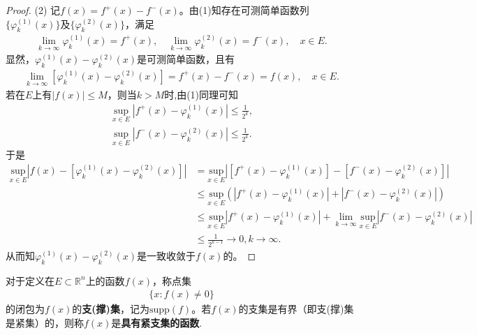 \documentclass[../../main.tex]{subfiles}
\begin{document}
\begin{proof}
(2) 记$f(x) = f^+(x) - f^-(x)$。由(1)知存在可测简单函数列$\{\varphi_k^{(1)}(x)\}$及$\{\varphi_k^{(2)}(x)\}$，满足
\begin{align*}
\lim_{k \to \infty} \varphi_k^{(1)}(x) = f^+(x), \quad \lim_{k \to \infty} \varphi_k^{(2)}(x) = f^-(x), \quad x \in E.
\end{align*}
显然，$\varphi_k^{(1)}(x) - \varphi_k^{(2)}(x)$是可测简单函数，且有
\begin{align*}
\lim_{k \to \infty} [\varphi_k^{(1)}(x) - \varphi_k^{(2)}(x)] = f^+(x) - f^-(x) = f(x), \quad x \in E.
\end{align*}
若在$E$上有$|f(x)| \leqslant M$，则当$k > M$时,由(1)同理可知
\begin{align*}
\sup_{x\in E} |f^+(x) - \varphi_k^{(1)}(x)| \leqslant \frac{1}{2^k},\\
\sup_{x\in E} |f^-(x) - \varphi_k^{(2)}(x)| \leqslant \frac{1}{2^k}.
\end{align*}
于是
\begin{align*}
\underset{x\in E}{\mathrm{sup}}\left| f\left( x \right) -\left[ \varphi _{k}^{(1)}(x)-\varphi _{k}^{(2)}(x) \right] \right|&=\underset{x\in E}{\mathrm{sup}}\left| \left[ f^+\left( x \right) -\varphi _{k}^{\left( 1 \right)}\left( x \right) \right] -\left[ f^-\left( x \right) -\varphi _{k}^{\left( 2 \right)}\left( x \right) \right] \right|
\\
&\leqslant \underset{x\in E}{\mathrm{sup}}\left( \left| f^+\left( x \right) -\varphi _{k}^{\left( 1 \right)}\left( x \right) \right|+\left| f^-\left( x \right) -\varphi _{k}^{\left( 2 \right)}\left( x \right) \right| \right) 
\\
&\leqslant \underset{x\in E}{\mathrm{sup}}\left| f^+\left( x \right) -\varphi _{k}^{\left( 1 \right)}\left( x \right) \right|+\underset{k\rightarrow \infty}{\lim}\underset{x\in E}{\mathrm{sup}}\left| f^-\left( x \right) -\varphi _{k}^{\left( 2 \right)}\left( x \right) \right|
\\
&\leqslant \frac{1}{2^{k-1}}\rightarrow 0,k\rightarrow \infty .
\end{align*}
从而知$\varphi_k^{(1)}(x) - \varphi_k^{(2)}(x)$是一致收敛于$f(x)$的。 
\end{proof}

\begin{definition}
对于定义在$E \subset \mathbb{R}^n$上的函数$f(x)$，称点集
\begin{align*}
\{x: f(x) \neq 0\}
\end{align*}
的闭包为$f(x)$的\textbf{支(撑)集}，记为$\mathrm{supp}(f)$。若$f(x)$的支集是有界（即支(撑)集是紧集）的，则称$f(x)$是\textbf{具有紧支集的函数}. 
\end{definition}
\end{document}
